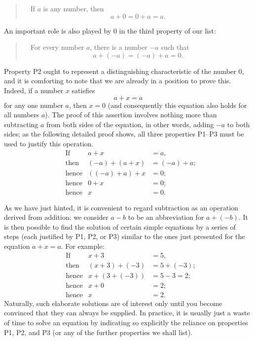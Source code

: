 \begin{quote}
\ \ If $a$ is any number, then
\[ a + 0 = 0 + a = a. \]
\end{quote}

An important role is also played by $0$ in the third property of our list:

\begin{quote}
\ \ For every number $a$, there is a number $-a$ such that
\[ a + (-a) = (-a) + a = 0. \]
\end{quote}

Property P2 ought to represent a distinguishing characteristic of the number
$0$, and it is comforting to note that we are already in a position to prove
this. Indeed, if a number $x$ satisfies
\[ a + x = a \]
for any one number $a$, then $x=0$ (and consequently this equation also holds
for all numbers $a$). The proof of this assertion involves nothing more than
subtracting $a$ from both sides of the equation, in other words, adding $-a$
to both sides; as the following detailed proof shows, all three properties
P1--P3 must be used to justify this operation.
\begin{align*}
&\text{If} & a + x &= a,\\
&\text{then} & (-a) + (a+x) &= (-a) + a;\\
&\text{hence} & ((-a)+a)+x &= 0;\\
&\text{hence} & 0 + x &= 0;\\
&\text{hence} & x &= 0.
\end{align*}

As we have just hinted, it is convenient to regard subtraction as an
operation derived from addition: we consider $a-b$ to be an abbreviation for
$a+(-b)$. It is then possible to find the solution of certain simple
equations by a series of steps (each justified by P1, P2, or P3) similar to
the ones just presented for the equation $a+x=a$. For example:
\begin{align*}
&\text{If} & x + 3 &= 5,\\
&\text{then} & (x+3)+(-3) &= 5 + (-3);\\
&\text{hence} & x + (3+(-3)) &= 5 - 3 = 2;\\
&\text{hence} & x + 0 &= 2;\\
&\text{hence} & x &= 2.
\end{align*}
Naturally, such elaborate solutions are of interest only until you become
convinced that they can always be supplied. In practice, it is usually just a
waste of time to solve an equation by indicating so explicitly the reliance
on properties P1, P2, and P3 (or any of the further properties we shall
list).

